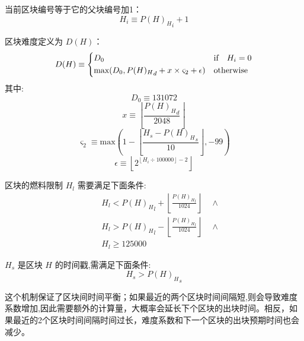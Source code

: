 \documentclass[9pt,oneside]{amsart}
\begin{document}
\begin{multicols}{2}
当前区块编号等于它的父块编号加1：
\begin{equation}
H_i \equiv {{P(H)_H}_i} + 1
\end{equation}

\newcommand{\mindifficulty}{D_0}
\newcommand{\homesteadmod}{\ensuremath{\varsigma_2}}
\newcommand{\expdiffsymb}{\ensuremath{\epsilon}}
\newcommand{\diffadjustment}{x}

区块难度定义为 $D(H)$：
\begin{equation}
D(H) \equiv \begin{dcases}
\mindifficulty & \text{if} \quad H_i = 0\\
\text{max}\!\left(\mindifficulty, {P(H)_H}_d + \diffadjustment\times\homesteadmod + \expdiffsymb \right) & \text{otherwise}\\
\end{dcases}
\end{equation}
其中:
\begin{equation}
\mindifficulty \equiv 131072
\end{equation}
\begin{equation}
\diffadjustment \equiv \left\lfloor\frac{{P(H)_H}_d}{2048}\right\rfloor
\end{equation}
\begin{equation}
\homesteadmod \equiv \text{max}\left( 1 - \left\lfloor\frac{H_s - {P(H)_H}_s}{10}\right\rfloor, -99 \right)
\end{equation}
\begin{equation}
\expdiffsymb \equiv \left\lfloor 2^{ \left\lfloor H_i \div 100000 \right\rfloor - 2 } \right\rfloor
\end{equation}

区块的燃料限制 $H_l$ 需要满足下面条件:
\begin{eqnarray}
& & H_l < {P(H)_H}_l + \left\lfloor\frac{{P(H)_H}_l}{1024}\right\rfloor \quad \wedge \\
& & H_l > {P(H)_H}_l - \left\lfloor\frac{{P(H)_H}_l}{1024}\right\rfloor \quad \wedge \\
& & H_l \geqslant 125000
\end{eqnarray}

$H_s$ 是区块 $H$ 的时间戳,需满足下面条件:
\begin{equation}
H_s > {P(H)_H}_s
\end{equation}

这个机制保证了区块间时间平衡；如果最近的两个区块时间间隔短,则会导致难度系数增加,因此需要额外的计算量，大概率会延长下个区块的出块时间。相反，如果最近的2个区块时间间隔时间过长，难度系数和下一个区块的出块预期时间也会减少。


\end{multicols}
\end{document}
